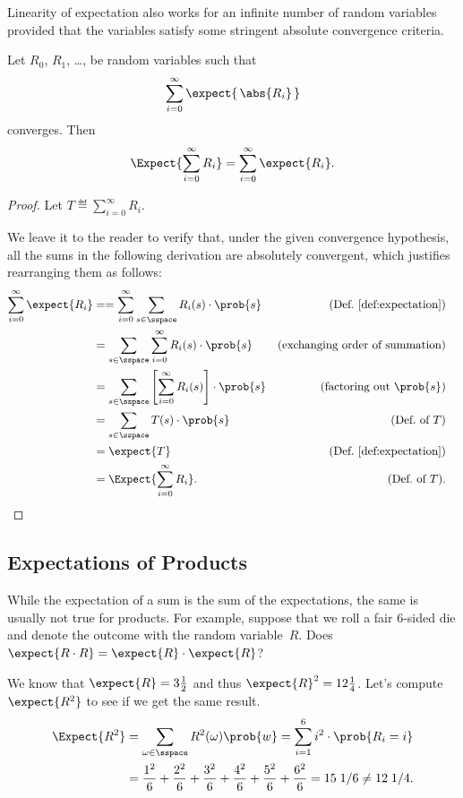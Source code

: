 Linearity of expectation also works for an infinite number of random
variables provided that the variables satisfy some stringent absolute
convergence criteria.

\begin{theorem}\label{linexp}
Let $R_0$, $R_1$, \dots, be random variables such that
\[
\sum_{i = 0}^\infty \expect{\, \abs{R_i}\, }
\]
converges.  Then
\[
   \Expect{\sum_{i = 0}^\infty R_i} = \sum_{i = 0}^\infty \expect{R_i}.
\]
\end{theorem}

\begin{proof}
Let $T \eqdef \sum_{i = 0}^\infty R_i$.

We leave it to the reader to verify that, under the given convergence
hypothesis, all the sums in the following derivation are absolutely
convergent, which justifies rearranging them as follows:
\begin{align*}
\sum_{i=0}^\infty \expect{R_i}
    &== \sum_{i=0}^\infty \sum_{s \in \sspace} R_i(s) \cdot \prob{s}
            & \text{(Def.~\ref{def:expectation})}\\
    &= \sum_{s \in \sspace} \sum_{i=0}^\infty R_i(s) \cdot \prob{s}
           & \text{(exchanging order of summation)}\\
    &= \sum_{s \in \sspace} \left[ \sum_{i=0}^\infty R_i(s) \right] \cdot \prob{s}
                & \text{(factoring out $\prob{s}$)}\\
    &= \sum_{s \in \sspace} T(s) \cdot \prob{s} & \text{(Def.\ of $T$)}\\
    &= \expect{T} & \text{(Def.~\ref{def:expectation})}\\
    &= \Expect{\sum_{i = 0}^\infty R_i}. &  \text{(Def.\ of $T$)}. &\qedhere
\end{align*}
\end{proof}

\subsection{Expectations of Products}

While the expectation of a sum is the sum of the expectations, the same is
usually not true for products.  For example, suppose that we roll a
fair 6-sided die and denote the outcome with the random variable~$R$.
Does $\expect{R \cdot R} = \expect{R} \cdot \expect{R}$?

We know that $\expect{R} = 3\frac{1}{2}$ and thus $\expect{R}^2 =
12\frac{1}{4}$.  Let's compute~$\expect{R^2}$ to see if we get the same
result.
\begin{align*}
\Expect{R^2}
   & = \sum_{\omega \in \sspace} R^2(\omega) \prob{w}
     = \sum_{i=1}^6 i^2 \cdot \prob{R_i = i} \\
   & = \frac{1^2}{6} + \frac{2^2}{6} + \frac{3^2}{6} +
            \frac{4^2}{6} + \frac{5^2}{6} + \frac{6^2}{6} 
     =  15\; 1/6 \neq  12 \; 1/4.
\end{align*}

